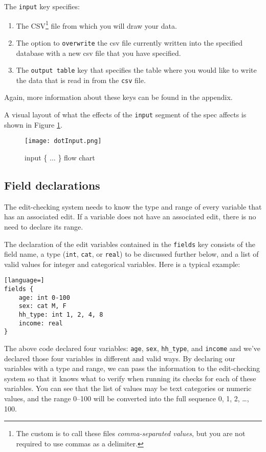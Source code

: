 \documentclass{article}
\begin{document}
The {\tt input} key specifies:
\begin{enumerate}
\item The  CSV\footnote{The custom is to call these files {\em
    comma-separated values}, but you are not required to use commas as a delimiter.} file from which you will draw your data.
\item The option to \texttt{overwrite} the csv file currently written into the specified database with 
a new csv file that you have specified.
\item The {\tt output table} key that specifies the table where you would like to 
write the data that is read in from the {\tt csv} file.
\end{enumerate}

Again, more information about these keys can be found in the appendix.

A visual layout of what the effects of the {\tt input} segment of the spec affects is shown in Figure \ref{inputfigure}.  

\begin{figure}
\begin{center}
\texttt{[image: dotInput.png]}
\caption{input \{ $\ldots$ \} flow chart}\label{inputfigure}
\end{center}
\end{figure}

\subsection{Field declarations} The edit-checking system needs to know the type and range
of every variable that has an associated edit. If a variable does not have an associated
edit, there is no need to declare its range.

The declaration of the edit variables contained in the {\tt fields} key consists of the field name, 
a type ({\tt int}, {\tt cat}, or 
{\tt real}) to be discussed further below, and a list of valid values for integer and categorical variables. Here is a typical example:

\begin{lstlisting}[language=]
fields {
    age: int 0-100
    sex: cat M, F
    hh_type: int 1, 2, 4, 8
    income: real
}
\end{lstlisting}

The above code declared four variables: {\tt age}, {\tt sex}, {\tt hh\_type}, and {\tt income} and we've 
declared those four variables in different and valid ways.
By declaring our variables with a type and range, we can pass the information to the edit-checking system 
so that it knows what to verify when running its checks for each of these variables. 
You can see that the list of values may be text categories
or numeric values, and the range 0--100 will be converted into the full sequence 0, 1, 2, \dots, 100. 
\end{document}
